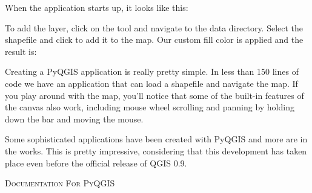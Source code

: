 When the application starts up, it looks like this:


To add the  layer, click on the 
 tool and navigate to the data directory.
Select the shapefile and click  to add it to the map. 
Our custom fill color is applied and the result is:


Creating a PyQGIS application is really pretty simple. 
In less than 150 lines of code we have an application that can
load a shapefile and navigate the map. If you play around with the map, 
you'll notice that some of the built-in features
of the canvas also work, including mouse wheel scrolling and panning by 
holding down the  bar and
moving the mouse.

Some sophisticated applications have been created with PyQGIS and more are in 
the works. This is pretty impressive,
considering that this development has taken place even before the official 
release of QGIS 0.9.

\begin{Tip}\caption{\textsc{Documentation For PyQGIS}}
\end{Tip} 
